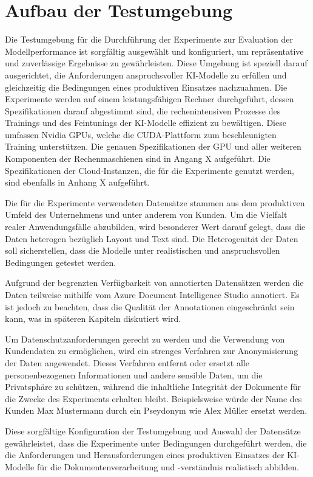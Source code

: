 \section{Aufbau der Testumgebung}
Die Testumgebung für die Durchführung der Experimente zur Evaluation der Modellperformance ist sorgfältig ausgewählt und konfiguriert, um repräsentative und zuverlässige Ergebnisse zu gewährleisten. Diese Umgebung ist speziell darauf ausgerichtet, die Anforderungen anspruchsvoller KI-Modelle zu erfüllen und gleichzeitig die Bedingungen eines produktiven Einsatzes nachzuahmen.
Die Experimente werden auf einem leistungsfähigen Rechner durchgeführt, dessen Spezifikationen darauf abgestimmt sind, die rechenintensiven Prozesse des Trainings und des Feintunings der KI-Modelle effizient zu bewältigen. Diese umfassen Nvidia GPUs, welche die \ac{CUDA}-Plattform zum beschleunigten Training unterstützen. Die genauen Spezifikationen der GPU und aller weiteren Komponenten der Rechenmaschienen sind in Angang X aufgeführt. Die Spezifikationen der Cloud-Instanzen, die für die Experimente genutzt werden, sind ebenfalls in Anhang X aufgeführt.

Die für die Experimente verwendeten Datensätze stammen aus dem produktiven Umfeld des Unternehmens und unter anderem von Kunden. Um die Vielfalt realer Anwendungsfälle abzubilden, wird besonderer Wert darauf gelegt, dass die Daten heterogen bezüglich Layout und Text sind. Die Heterogenität der Daten soll sicherstellen, dass die Modelle unter realistischen und anspruchsvollen Bedingungen getestet werden.

Aufgrund der begrenzten Verfügbarkeit von annotierten Datensätzen werden die Daten teilweise mithilfe vom Azure Document Intelligence Studio annotiert. Es ist jedoch zu beachten, dass die Qualität der Annotationen eingeschränkt sein kann, was in späteren Kapiteln diskutiert wird. 

Um Datenschutzanforderungen gerecht zu werden und die Verwendung von Kundendaten zu ermöglichen, wird ein strenges Verfahren zur Anonymisierung der Daten angewendet. Dieses Verfahren entfernt oder ersetzt alle personenbezogenen Informationen und andere sensible Daten, um die Privatsphäre zu schützen, während die inhaltliche Integrität der Dokumente für die Zwecke des Experiments erhalten bleibt. Beispielsweise würde der Name des Kunden Max Mustermann durch ein Pseydonym wie Alex Müller ersetzt werden. 

Diese sorgfältige Konfiguration der Testumgebung und Auswahl der Datensätze gewährleistet, dass die Experimente unter Bedingungen durchgeführt werden, die die Anforderungen und Herausforderungen eines produktiven Einsatzes der KI-Modelle für die Dokumentenverarbeitung und -verständnis realistisch abbilden.